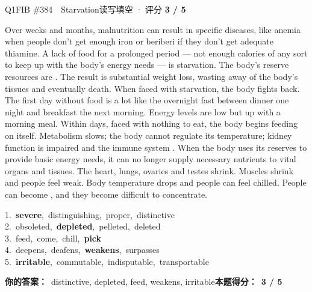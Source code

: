 \begin{qblock}{Q1\quad FIB \#384\ \ Starvation}{读写填空 · 评分 \textcolor{cAccent}{\bfseries 3 / 5}}
\begin{promptbox}
Over weeks and months, malnutrition can result in specific diseases, like anemia when people don't get enough iron or beriberi if they don't get adequate thiamine. A  lack of food for a prolonged period --- not enough calories of any sort to keep up with the body's energy needs --- is starvation. The body's reserve resources are . The result is substantial weight loss, wasting away of the body's tissues and eventually death. When faced with starvation, the body fights back. The first day without food is a lot like the overnight fast between dinner one night and breakfast the next morning. Energy levels are low but  up with a morning meal. Within days, faced with nothing to eat, the body begins feeding on itself. Metabolism slows; the body cannot regulate its temperature; kidney function is impaired and the immune system . When the body uses its reserves to provide basic energy needs, it can no longer supply necessary nutrients to vital organs and tissues. The heart, lungs, ovaries and testes shrink. Muscles shrink and people feel weak. Body temperature drops and people can feel chilled. People can become , and they become difficult to concentrate.
\end{promptbox}
{\small
1.\ \textbf{severe},\ distinguishing,\ proper,\ distinctive\\
2.\ obsoleted,\ \textbf{depleted},\ pelleted,\ deleted\\
3.\ feed,\ come,\ chill,\ \textbf{pick}\\
4.\ deepens,\ deafens,\ \textbf{weakens},\ surpasses\\
5.\ \textbf{irritable},\ commutable,\ indisputable,\ transportable}
\par\smallskip
\textbf{你的答案：}\ {\color{cWrong}distinctive}, depleted, {\color{cWrong}feed}, weakens, irritable\qquad\textbf{本题得分：}\ {\color{cAccent}\bfseries 3 / 5}
\end{qblock}

